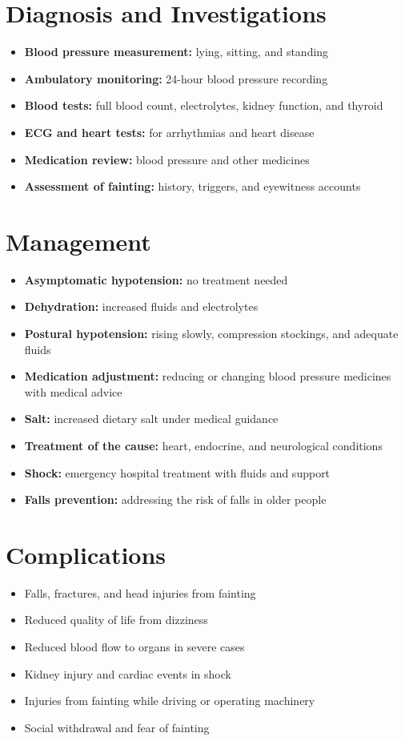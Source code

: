 \section*{Diagnosis and Investigations}
\begin{itemize}
    \item \textbf{Blood pressure measurement:} lying, sitting, and standing
    \item \textbf{Ambulatory monitoring:} 24-hour blood pressure recording
    \item \textbf{Blood tests:} full blood count, electrolytes, kidney function, and thyroid
    \item \textbf{ECG and heart tests:} for arrhythmias and heart disease
    \item \textbf{Medication review:} blood pressure and other medicines
    \item \textbf{Assessment of fainting:} history, triggers, and eyewitness accounts
\end{itemize}

\section*{Management}
\begin{itemize}
    \item \textbf{Asymptomatic hypotension:} no treatment needed
    \item \textbf{Dehydration:} increased fluids and electrolytes
    \item \textbf{Postural hypotension:} rising slowly, compression stockings, and adequate fluids
    \item \textbf{Medication adjustment:} reducing or changing blood pressure medicines with medical advice
    \item \textbf{Salt:} increased dietary salt under medical guidance
    \item \textbf{Treatment of the cause:} heart, endocrine, and neurological conditions
    \item \textbf{Shock:} emergency hospital treatment with fluids and support
    \item \textbf{Falls prevention:} addressing the risk of falls in older people
\end{itemize}

\section*{Complications}
\begin{itemize}
    \item Falls, fractures, and head injuries from fainting
    \item Reduced quality of life from dizziness
    \item Reduced blood flow to organs in severe cases
    \item Kidney injury and cardiac events in shock
    \item Injuries from fainting while driving or operating machinery
    \item Social withdrawal and fear of fainting
\end{itemize}

